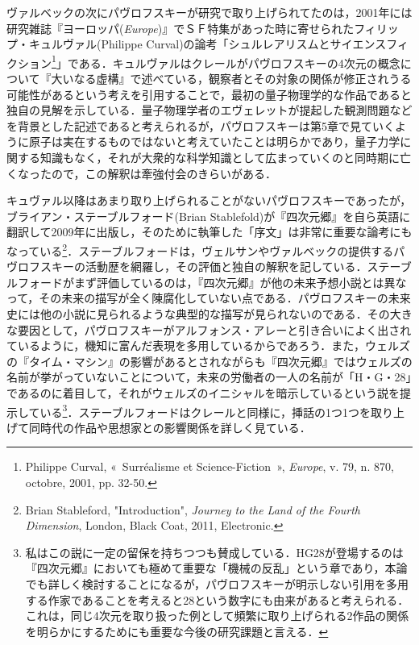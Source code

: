 ヴァルベックの次にパヴロフスキーが研究で取り上げられてたのは，2001年には研究雑誌『ヨーロッパ(\emph{Europe})』でＳＦ特集があった時に寄せられたフィリップ・キュルヴァル(Philippe Curval)の論考「シュルレアリスムとサイエンスフィクション\footnote{Philippe Curval, «~Surréalisme et Science-Fiction~», \emph{Europe}, v. 79, n. 870, octobre, 2001, pp. 32-50.}」である．キュルヴァルはクレールがパヴロフスキーの4次元の概念について『大いなる虚構』で述べている，観察者とその対象の関係が修正されうる可能性があるという考えを引用することで，最初の量子物理学的な作品であると独自の見解を示している．量子物理学者のエヴェレットが提起した観測問題などを背景とした記述であると考えられるが，パヴロフスキーは第5章で見ていくように原子は実在するものではないと考えていたことは明らかであり，量子力学に関する知識もなく，それが大衆的な科学知識として広まっていくのと同時期に亡くなったので，この解釈は牽強付会のきらいがある．

キュヴァル以降はあまり取り上げられることがないパヴロフスキーであったが，ブライアン・ステーブルフォード(Brian Stablefold)が『四次元郷』を自ら英語に翻訳して2009年に出版し，そのために執筆した「序文」は非常に重要な論考にもなっている\footnote{Brian Stableford, "Introduction", \emph{Journey to the Land of the Fourth Dimension},  London, Black Coat, 2011, Electronic.}．ステーブルフォードは，ヴェルサンやヴァルベックの提供するパヴロフスキーの活動歴を網羅し，その評価と独自の解釈を記している．ステーブルフォードがまず評価しているのは，『四次元郷』が他の未来予想小説とは異なって，その未来の描写が全く陳腐化していない点である．パヴロフスキーの未来史には他の小説に見られるような典型的な描写が見られないのである．その大きな要因として，パヴロフスキーがアルフォンス・アレーと引き合いによく出されているように，機知に富んだ表現を多用しているからであろう．また，ウェルズの『タイム・マシン』の影響があるとされながらも『四次元郷』ではウェルズの名前が挙がっていないことについて，未来の労働者の一人の名前が「H・G・28」であるのに着目して，それがウェルズのイニシャルを暗示しているという説を提示している\footnote{私はこの説に一定の留保を持ちつつも賛成している．HG28が登場するのは『四次元郷』においても極めて重要な「機械の反乱」という章であり，本論でも詳しく検討することになるが，パヴロフスキーが明示しない引用を多用する作家であることを考えると28という数字にも由来があると考えられる．これは，同じ4次元を取り扱った例として頻繁に取り上げられる2作品の関係を明らかにするためにも重要な今後の研究課題と言える．}．ステーブルフォードはクレールと同様に，挿話の1つ1つを取り上げて同時代の作品や思想家との影響関係を詳しく見ている．

